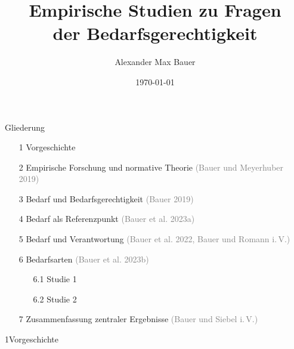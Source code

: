 \documentclass[xcolor=table,9pt,aspectratio=169]{beamer}
\title{Empirische Studien zu Fragen\\der Bedarfsgerechtigkeit}
\subtitle{}
\author{Alexander Max Bauer}
\date{\renewcommand{\dateseparator}{.}\ddmmyyyydate\today}
\begin{document}
{
\begin{frame}
   \maketitle
\end{frame}
}


\begin{frame}{\vspace*{10mm}Gliederung}
\begin{itemize}
   \item[1] \hspace*{1em}Vorgeschichte
   \item[2] \hspace*{1em}Empirische Forschung und normative Theorie \textcolor{gray}{(Bauer und Meyerhuber 2019)}
   \item[3] \hspace*{1em}Bedarf und Bedarfsgerechtigkeit \textcolor{gray}{(Bauer 2019)}
   \item[4] \hspace*{1em}Bedarf als Referenzpunkt \textcolor{gray}{(Bauer et al. 2023a)}
   \item[5] \hspace*{1em}Bedarf und Verantwortung \textcolor{gray}{(Bauer et al. 2022, Bauer und Romann i.\,V.)}
   \item[6] \hspace*{1em}Bedarfsarten \textcolor{gray}{(Bauer et al. 2023b)}
   \begin{itemize}
      \item[6.1] \hspace*{1em}Studie 1
      \item[6.2] \hspace*{1em}Studie 2
   \end{itemize}
   \item[7] \hspace*{1em}Zusammenfassung zentraler Ergebnisse \textcolor{gray}{(Bauer und Siebel i.\,V.)}
\end{itemize}
\end{frame}


\begin{frame}
\begin{overlayarea}{\textwidth}{0.81\paperheight}{
   \vspace*{11mm}
   \textcolor{uolblue}
   {1\hspace*{1em}Vorgeschichte}
}
\end{overlayarea}
\end{frame}
\end{document}
